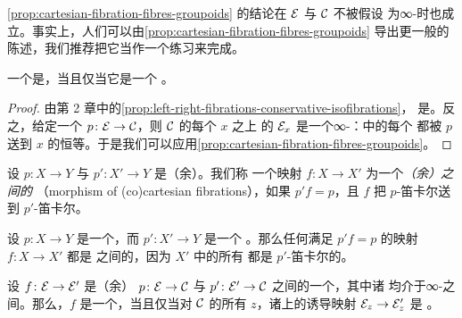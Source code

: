 \begin{remark}\label{rem:cartesian-fibration-fibres-groupoids-general}
\cref{prop:cartesian-fibration-fibres-groupoids} 的结论在 $\mathcal{E}$ 与 $\mathcal{C}$ 不被假设
为∞-\trCategories{}时也成立。事实上，人们可以由\cref{prop:cartesian-fibration-fibres-groupoids}
导出更一般的陈述，我们推荐把它当作一个练习来完成。
\end{remark}

\begin{corollary}\label{cor:cartesian-fibration-conservative}
一个\trCartesianFibration{}是\trConservative{}，当且仅当它是一个%
\trRightFibration{}。
\end{corollary}

\begin{proof}
由第 2 章中的\cref{prop:left-right-fibrations-conservative-isofibrations}，%
\trRightFibration{}是\trConservative{}。反之，给定一个\trConservative{}%
\trCartesianFibration{} $p\colon \mathcal{E} \to \mathcal{C}$，则 $\mathcal{C}$ 的每个\trObject{} $x$ 之上
的\trFibre{} $\mathcal{E}_x$ 是一个∞-\trGroupoid{}：\trFibre{}中的每个\trMorphism{}%
都被 $p$ 送到 $x$ 的恒等。于是我们可以应用\cref{prop:cartesian-fibration-fibres-groupoids}。
\end{proof}

\begin{definition}\label{def:morphism-of-fibrations}
设 $p\colon X \to Y$ 与 $p'\colon X' \to Y$ 是（余）\trCartesianFibration{}。我们称
一个映射 $f\colon X \to X'$ 为一个\emph{（余）\trCartesianFibration{}之间的%
\trMorphism{}}（morphism of (co)cartesian fibrations），如果 $p'f = p$，且 $f$
把 $p$-笛卡尔\trMorphism{}送到 $p'$-笛卡尔\trMorphism{}。
\end{definition}

\begin{example*}
设 $p\colon X \to Y$ 是一个\trCartesianFibration{}，而 $p'\colon X' \to Y$ 是一个%
\trRightFibration{}。那么任何满足 $p'f = p$ 的映射 $f\colon X \to X'$ 都是%
\trCartesianFibration{}之间的\trMorphism{}，因为 $X'$ 中的所有\trMorphism{}%
都是 $p'$-笛卡尔的。
\end{example*}

\begin{theorem}\label{thm:fibrewise-criterion}
设 $f\colon \mathcal{E} \to \mathcal{E}'$ 是（余）\trCartesianFibration{} $p\colon \mathcal{E} \to \mathcal{C}$ 与
$p'\colon \mathcal{E}' \to \mathcal{C}$ 之间的一个\trMorphism{}，其中诸\trCartesianFibration{}%
均介于∞-\trCategories{}之间。那么，$f$ 是一个\trJoyalEquivalence{}，当且仅当对
$\mathcal{C}$ 的所有\trObject{} $z$，诸\trFibre{}上的诱导映射 $\mathcal{E}_z \to \mathcal{E}'_z$ 是%
\trJoyalEquivalence{}。
\end{theorem}

